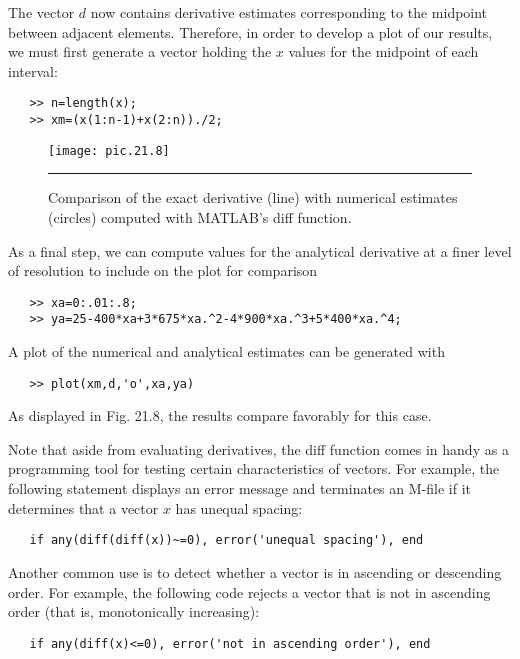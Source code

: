 \documentclass[../main.tex]{subfiles}
\begin{document}
The vector $d$ now contains derivative estimates corresponding to the midpoint between adjacent elements. Therefore, in order to develop a plot of our results, we must first
generate a vector holding the $x$ values for the midpoint of each interval:

\begin{verbatim}
   >> n=length(x);
   >> xm=(x(1:n-1)+x(2:n))./2;
\end{verbatim}
\pagebreak
\begin{figure}[hbt!]
	\centering
	\texttt{[image: pic.21.8]}
	\caption{\textsf{Comparison of the exact derivative (line) with numerical estimates (circles) computed with
MATLAB's diff function.}} \vspace{0.1in} \hrule
	\label{pic.21.8}
\end{figure}
As a final step, we can compute values for the analytical derivative at a finer level of resolution to include on the plot for comparison

\begin{verbatim}
   >> xa=0:.01:.8;
   >> ya=25-400*xa+3*675*xa.^2-4*900*xa.^3+5*400*xa.^4;
\end{verbatim}
A plot of the numerical and analytical estimates can be generated with
\begin{verbatim}
   >> plot(xm,d,'o',xa,ya)
\end{verbatim}
As displayed in Fig. 21.8, the results compare favorably for this case.
\vspace{0.4in}

Note that aside from evaluating derivatives, the diff function comes in handy as a
programming tool for testing certain characteristics of vectors. For example, the following
statement displays an error message and terminates an M-file if it determines that a vector
$x$ has unequal spacing:
\begin{verbatim}
   if any(diff(diff(x))~=0), error('unequal spacing'), end
\end{verbatim}

Another common use is to detect whether a vector is in ascending or descending order.
For example, the following code rejects a vector that is not in ascending order (that is, monotonically increasing):
\begin{verbatim}
   if any(diff(x)<=0), error('not in ascending order'), end
\end{verbatim}
\end{document}

